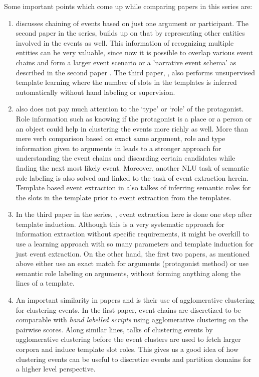 Some important points which come up while comparing papers in this series are:
\begin{enumerate}
\item {} \citeauthor{chju2008ec} discusses chaining of events based on just one argument or participant. The second paper in the series, \citeauthor{chju2009} builds up on that by representing other entities involved in the events as well. This information of recognizing multiple entities can be very valuable, since now it is possible to overlap various event chains and form a larger event scenario or a 'narrative event schema' as described in the second paper \citeauthor{chju2009}. The third paper, \citeauthor{chju2011}, also performs unsupervised template learning where the number of slots in the templates is inferred automatically without hand labeling or supervision. 

\item {}\citeauthor{chju2008ec} also does not pay much attention to the ‘type’ or ‘role’ of the protagonist. Role information such as knowing if the protagonist is a place or a person or an object could help in clustering the events more richly as well. More than mere verb comparison based on exact same argument, role and type information given to arguments in \citeauthor{chju2009} leads to a stronger approach for understanding the event chains and discarding certain candidates while finding the next most likely event. Moreover, another NLU task of semantic role labeling is also solved and linked to the task of event extraction herein. Template based event extraction in \citeauthor{chju2011} also talkes of inferring semantic roles for the slots in the template prior to event extraction from the templates.

\item {}In the third paper in the series, \citeauthor{chju2011}, event extraction here is done one step after template induction. Although this is a very systematic approach for information extraction without specific requirements, it might be overkill to use a learning approach with so many parameters and template induction for just event extraction. On the other hand, the first two papers, as mentioned above either use an exact match for arguments (protagonist method) or use semantic role labeling on arguments, without forming anything along the lines of a template.

\item {}An important similarity in papers \citeauthor{chju2008ec} and \citeauthor{chju2011} is their use of agglomerative clustering for clustering events. In the first paper, event chains are discretized to be comparable with {\em hand labelled scripts} using agglomerative clustering on the pairwise scores. Along similar lines, \citeauthor {chju2011} talks of clustering events by agglomerative clustering before the event clusters are used to fetch larger corpora and induce template slot roles. This gives us a good idea of how clustering events can be useful to discretize events and partition domains for a higher level perspective.
\end{enumerate}
 
